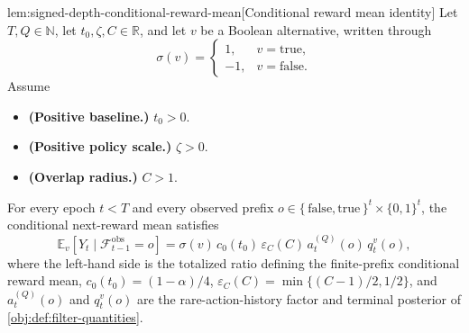 \documentclass[11pt]{article}
\begin{document}
\begin{lemmav}{lem:signed-depth-conditional-reward-mean}[Conditional reward mean identity]
Let \(T,Q\in\mathbb N\), let \(t_0,\zeta,C\in\mathbb R\), and let \(v\) be a Boolean alternative, written through
\[
\sigma(v)=
\begin{cases}
1, & v=\mathrm{true},\\
-1, & v=\mathrm{false}.
\end{cases}
\]
Assume
\begin{itemize}
\item \textbf{(Positive baseline.)} \(t_0>0\).
\item \textbf{(Positive policy scale.)} \(\zeta>0\).
\item \textbf{(Overlap radius.)} \(C>1\).
\end{itemize}
For every epoch \(t<T\) and every observed prefix \(o\in\{\,\mathrm{false},\mathrm{true}\,\}^{t}\times\{0,1\}^{t}\), the conditional next-reward mean satisfies
\[
\mathbb E_v[Y_t\mid \mathcal F_{t-1}^{\mathrm{obs}}=o]
=
\sigma(v)\,c_0(t_0)\,\varepsilon_C(C)\,
a_t^{(Q)}(o)\,q_t^v(o),
\]
where the left-hand side is the totalized ratio defining the finite-prefix conditional reward mean, \(c_0(t_0)=(1-\alpha)/4\), \(\varepsilon_C(C)=\min\{(C-1)/2,1/2\}\), and \(a_t^{(Q)}(o)\) and \(q_t^v(o)\) are the rare-action-history factor and terminal posterior of \cref{obj:def:filter-quantities}.
\end{lemmav}
\end{document}
